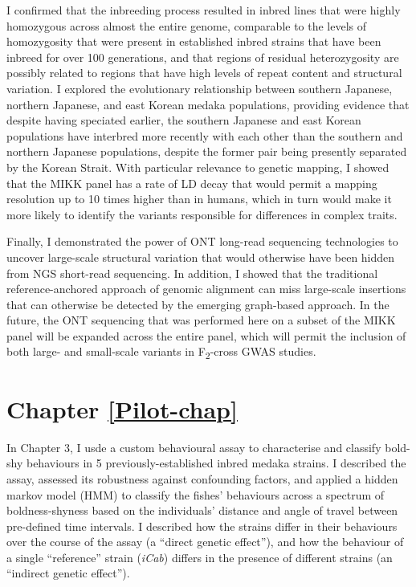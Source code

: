 \documentclass[
]{book}
\begin{document}
I confirmed that the inbreeding process resulted in inbred lines that were highly homozygous across almost the entire genome, comparable to the levels of homozygosity that were present in established inbred strains that have been inbreed for over 100 generations, and that regions of residual heterozygosity are possibly related to regions that have high levels of repeat content and structural variation. I explored the evolutionary relationship between southern Japanese, northern Japanese, and east Korean medaka populations, providing evidence that despite having speciated earlier, the southern Japanese and east Korean populations have interbred more recently with each other than the southern and northern Japanese populations, despite the former pair being presently separated by the Korean Strait. With particular relevance to genetic mapping, I showed that the MIKK panel has a rate of LD decay that would permit a mapping resolution up to 10 times higher than in humans, which in turn would make it more likely to identify the variants responsible for differences in complex traits.

Finally, I demonstrated the power of ONT long-read sequencing technologies to uncover large-scale structural variation that would otherwise have been hidden from NGS short-read sequencing. In addition, I showed that the traditional reference-anchored approach of genomic alignment can miss large-scale insertions that can otherwise be detected by the emerging graph-based approach. In the future, the ONT sequencing that was performed here on a subset of the MIKK panel will be expanded across the entire panel, which will permit the inclusion of both large- and small-scale variants in F\textsubscript{2}-cross GWAS studies.

\hypertarget{chapter-refpilot-chap}{%
\section*{Chapter \ref{Pilot-chap}}\label{chapter-refpilot-chap}}

In Chapter 3, I usde a custom behavioural assay to characterise and classify bold-shy behaviours in 5 previously-established inbred medaka strains. I described the assay, assessed its robustness against confounding factors, and applied a hidden markov model (HMM) to classify the fishes' behaviours across a spectrum of boldness-shyness based on the individuals' distance and angle of travel between pre-defined time intervals. I described how the strains differ in their behaviours over the course of the assay (a ``direct genetic effect''), and how the behaviour of a single ``reference'' strain (\emph{iCab}) differs in the presence of different strains (an ``indirect genetic effect'').
\end{document}
